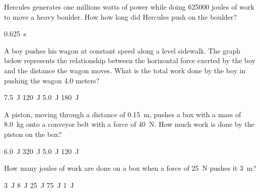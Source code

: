 \documentclass[]{exam}
\begin{document}
\begin{questions}
\question \label{b9UIEt}
Hercules generates one millions watts of power while doing \SI{625000}{} joules of work to move a heavy boulder. How how long did Hercules push on the boulder?

\begin{solution}
\SI{0.625}{s}
\end{solution}

\question
A boy pushes his wagon at constant speed along a level sidewalk. The graph below represents the relationship between the horizontal force exerted by the boy and the distance the wagon moves. What is the total work done by the boy in pushing the wagon 4.0 meters?

\begin{center}
\end{center}

\begin{randomizechoices}
\choice \SI{7.5}{J}
\correctchoice \SI{120}{J}
\choice \SI{5.0}{J}
\choice \SI{180}{J}
\end{randomizechoices}

\question
A piston, moving through a distance of \SI{0.15}{m}, pushes a box with a mass of \SI{8.0}{kg} onto a conveyor belt with a force of \SI{40}{N}. How much work is done by the piston on the box?

\begin{randomizechoices}
\correctchoice \SI{6.0}{J}
\choice \SI{320}{J}
\choice \SI{5.0}{J}
\choice \SI{120}{J}
\end{randomizechoices}

\question
How many joules of work are done on a box when a force of \SI{25}{N} pushes it \SI{3}{m}?

\begin{randomizechoices}
\choice \SI{3}{J}
\choice \SI{8}{J}
\choice \SI{25}{J}
\correctchoice \SI{75}{J}
\choice \SI{1}{J}
\end{randomizechoices}
\end{questions}
\end{document}
